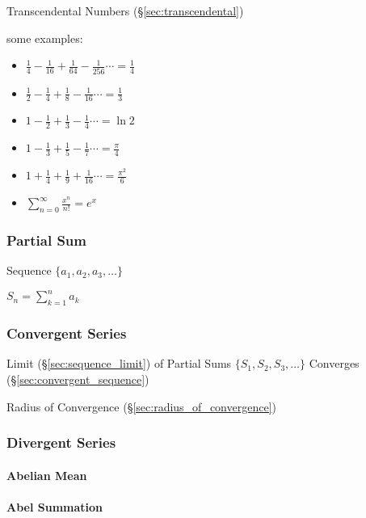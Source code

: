 Transcendental Numbers (\S\ref{sec:transcendental})

some examples:
\begin{itemize}
  \item $\frac{1}{4} - \frac{1}{16} + \frac{1}{64} - \frac{1}{256} \cdots
    = \frac{1}{4}$
  \item $\frac{1}{2} - \frac{1}{4} + \frac{1}{8} - \frac{1}{16} \cdots
    = \frac{1}{3}$
  \item $1 - \frac{1}{2} + \frac{1}{3} - \frac{1}{4} \cdots  = \ln{2}$
  \item $1 - \frac{1}{3} + \frac{1}{5} - \frac{1}{7} \cdots  = \frac{\pi}{4}$
  \item $1 + \frac{1}{4} + \frac{1}{9} + \frac{1}{16} \cdots = \frac{\pi^2}{6}$
  \item $\sum_{n=0}^\infty \frac{x^n}{n!} = e^x$
\end{itemize}



\subsubsection{Partial Sum}\label{sec:partial_sum}

Sequence $\{ a_1, a_2, a_3, \ldots \}$

$S_n = \sum_{k=1}^n a_k$



\subsubsection{Convergent Series}\label{sec:convergent_series}

Limit (\S\ref{sec:sequence_limit}) of Partial Sums $\{ S_1, S_2, S_3,
\ldots \}$ Converges (\S\ref{sec:convergent_sequence})

\fist Radius of Convergence (\S\ref{sec:radius_of_convergence})



\subsubsection{Divergent Series}\label{sec:divergent_series}

\paragraph{Abelian Mean}\label{sec:abelian_mean}\hfill

\paragraph{Abel Summation}\label{sec:abel_summation}\hfill

